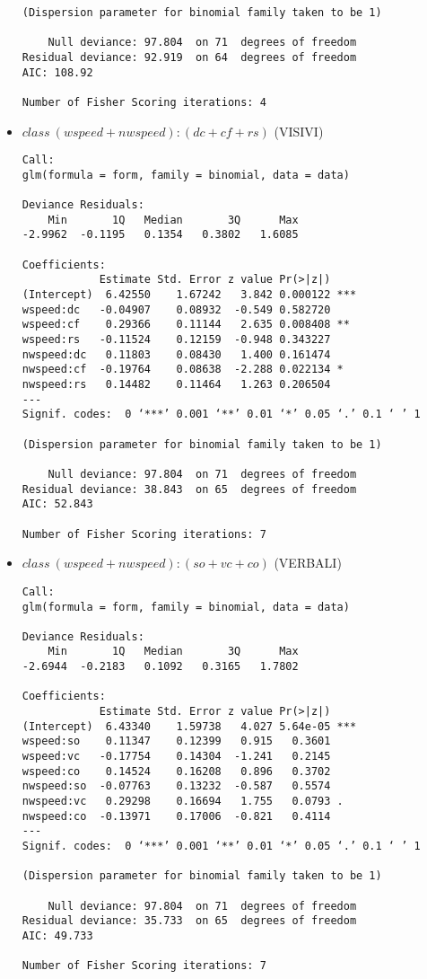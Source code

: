\documentclass[11pt, a4paper, twoside, openright]{article}
\begin{document}
\begin{itemize}
\begin{verbatim}
(Dispersion parameter for binomial family taken to be 1)

    Null deviance: 97.804  on 71  degrees of freedom
Residual deviance: 92.919  on 64  degrees of freedom
AIC: 108.92

Number of Fisher Scoring iterations: 4
\end{verbatim}

\item $class~(wspeed+nwspeed):(dc+cf+rs)$ (VISIVI)
\begin{verbatim}
Call:
glm(formula = form, family = binomial, data = data)

Deviance Residuals: 
    Min       1Q   Median       3Q      Max  
-2.9962  -0.1195   0.1354   0.3802   1.6085  

Coefficients:
            Estimate Std. Error z value Pr(>|z|)    
(Intercept)  6.42550    1.67242   3.842 0.000122 ***
wspeed:dc   -0.04907    0.08932  -0.549 0.582720    
wspeed:cf    0.29366    0.11144   2.635 0.008408 ** 
wspeed:rs   -0.11524    0.12159  -0.948 0.343227    
nwspeed:dc   0.11803    0.08430   1.400 0.161474    
nwspeed:cf  -0.19764    0.08638  -2.288 0.022134 *  
nwspeed:rs   0.14482    0.11464   1.263 0.206504    
---
Signif. codes:  0 ‘***’ 0.001 ‘**’ 0.01 ‘*’ 0.05 ‘.’ 0.1 ‘ ’ 1

(Dispersion parameter for binomial family taken to be 1)

    Null deviance: 97.804  on 71  degrees of freedom
Residual deviance: 38.843  on 65  degrees of freedom
AIC: 52.843

Number of Fisher Scoring iterations: 7
\end{verbatim}

\item $class~(wspeed+nwspeed):(so+vc+co)$ (VERBALI)
\begin{verbatim}
Call:
glm(formula = form, family = binomial, data = data)

Deviance Residuals: 
    Min       1Q   Median       3Q      Max  
-2.6944  -0.2183   0.1092   0.3165   1.7802  

Coefficients:
            Estimate Std. Error z value Pr(>|z|)    
(Intercept)  6.43340    1.59738   4.027 5.64e-05 ***
wspeed:so    0.11347    0.12399   0.915   0.3601    
wspeed:vc   -0.17754    0.14304  -1.241   0.2145    
wspeed:co    0.14524    0.16208   0.896   0.3702    
nwspeed:so  -0.07763    0.13232  -0.587   0.5574    
nwspeed:vc   0.29298    0.16694   1.755   0.0793 .  
nwspeed:co  -0.13971    0.17006  -0.821   0.4114    
---
Signif. codes:  0 ‘***’ 0.001 ‘**’ 0.01 ‘*’ 0.05 ‘.’ 0.1 ‘ ’ 1

(Dispersion parameter for binomial family taken to be 1)

    Null deviance: 97.804  on 71  degrees of freedom
Residual deviance: 35.733  on 65  degrees of freedom
AIC: 49.733

Number of Fisher Scoring iterations: 7
\end{verbatim}
\end{itemize}
\end{document}
